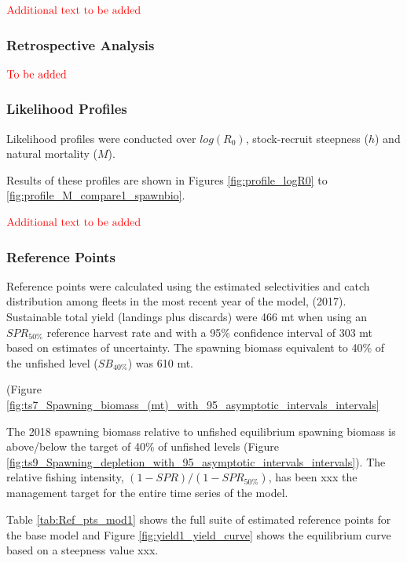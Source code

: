 \documentclass[12pt,]{article}
\begin{document}
\textbf{\(\color{red}{\text{Additional text to be added}}\)}

\hypertarget{retrospective-analysis}{%
\subsubsection{Retrospective Analysis}\label{retrospective-analysis}}

\textbf{\(\color{red}{\text{To be added}}\)}

\hypertarget{likelihood-profiles}{%
\subsubsection{Likelihood Profiles}\label{likelihood-profiles}}

Likelihood profiles were conducted over \(log(R_0)\), stock-recruit
steepness (\(h\)) and natural mortality (\(M\)).

Results of these profiles are shown in Figures \ref{fig:profile_logR0}
to \ref{fig:profile_M_compare1_spawnbio}.

\textbf{\(\color{red}{\text{Additional text to be added}}\)}

\hypertarget{reference-points-1}{%
\subsubsection{Reference Points}\label{reference-points-1}}

Reference points were calculated using the estimated selectivities and
catch distribution among fleets in the most recent year of the model,
(2017). Sustainable total yield (landings plus discards) were 466 mt
when using an \(SPR_{50\%}\) reference harvest rate and with a 95\%
confidence interval of 303 mt based on estimates of uncertainty. The
spawning biomass equivalent to 40\% of the unfished level
(\(SB_{40\%}\)) was 610 mt.

(Figure
\ref{fig:ts7_Spawning_biomass_(mt)_with_95_asymptotic_intervals_intervals}

The 2018 spawning biomass relative to unfished equilibrium spawning
biomass is above/below the target of 40\% of unfished levels (Figure
\ref{fig:ts9_Spawning_depletion_with_95_asymptotic_intervals_intervals}).
The relative fishing intensity, \((1-SPR)/(1-SPR_{50\%})\), has been xxx
the management target for the entire time series of the model.

Table \ref{tab:Ref_pts_mod1} shows the full suite of estimated reference
points for the base model and Figure \ref{fig:yield1_yield_curve} shows
the equilibrium curve based on a steepness value xxx.
\end{document}
